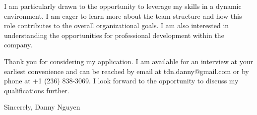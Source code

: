 \documentclass[letterpaper,11pt]{article}
\begin{document}
\vspace{10pt}
I am particularly drawn to the opportunity to leverage my skills in a dynamic environment. I am eager to learn more about the team structure and how this role contributes to the overall organizational goals. I am also interested in understanding the opportunities for professional development within the company.

\vspace{20pt}
Thank you for considering my application. I am available for an interview at your earliest convenience and can be reached by email at tdn.danny@gmail.com or by phone at +1 (236) 838-3069. I look forward to the opportunity to discuss my qualifications further.

\vspace{40pt} %
Sincerely,
Danny Nguyen

\end{document}
